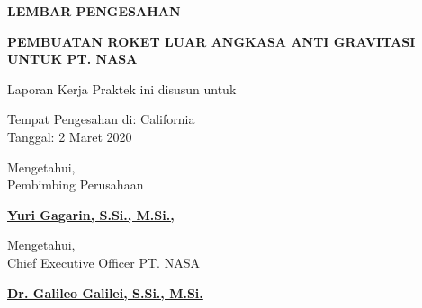 \begin{center}
  {\Large \textbf{LEMBAR PENGESAHAN}}
  \vspace{6ex}


  {\large \textbf{PEMBUATAN ROKET LUAR ANGKASA ANTI GRAVITASI UNTUK PT. NASA}}
  \vspace{6ex}

  Laporan Kerja Praktek ini disusun untuk \lipsum[1][1]
  \vspace{2ex}

  Tempat Pengesahan di: California \\
  Tanggal: 2 Maret 2020
  \vspace{8ex}

  Mengetahui, \\
  Pembimbing Perusahaan
  \vspace{12ex}

  \textbf{\underline{Yuri Gagarin, S.Si., M.Si.,}}
  \vspace{8ex}

  Mengetahui, \\
  Chief Executive Officer PT. NASA
  \vspace{12ex}

  \textbf{\underline{Dr. Galileo Galilei, S.Si., M.Si.}}

\end{center}